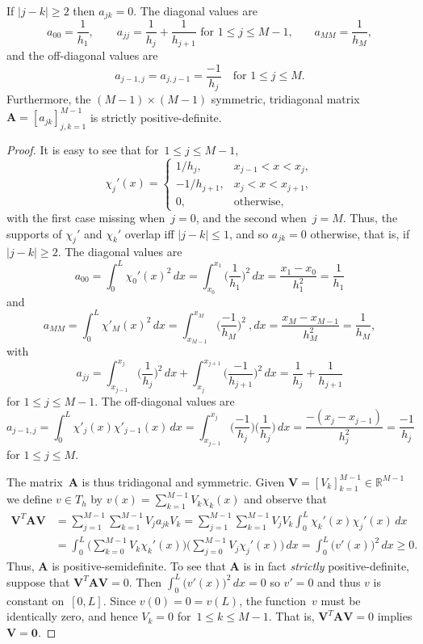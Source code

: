 \begin{theorem}
If $|j-k|\ge2$ then $a_{jk}=0$.  The diagonal values are
\[
a_{00}=\frac{1}{h_1},\qquad
\text{$a_{jj}=\frac{1}{h_j}+\frac{1}{h_{j+1}}$ for $1\le j\le M-1$,}\qquad
a_{MM}=\frac{1}{h_M},
\]
and the off-diagonal values are
\[
a_{j-1,j}=a_{j,j-1}=\frac{-1}{h_j}\quad\text{for $1\le j\le M$.}
\]
Furthermore, the $(M-1)\times(M-1)$ symmetric, tridiagonal 
matrix~$\boldsymbol{A}=[a_{jk}]_{j, k=1}^{M-1}$ is strictly positive-definite.
\end{theorem}
\begin{proof}
It is easy to see that for~$1\le j\le M-1$,
\[
\chi_j'(x)=\begin{cases}
1/h_j,&x_{j-1}<x<x_j,\\
-1/h_{j+1},&x_j<x<x_{j+1},\\
0,&\text{otherwise,}
\end{cases}
\]
with the first case missing when~$j=0$, and the second when~$j=M$.  Thus,
the supports of $\chi_j'$ and $\chi_k'$ overlap iff $|j-k|\le1$, and so 
$a_{jk}=0$ otherwise, that is, if $|j-k|\ge2$.  The diagonal 
values are
\[
a_{00}=\int_0^L\chi_0'(x)^2\,dx
    =\int_{x_0}^{x_1}\biggl(\frac{1}{h_1}\biggr)^2\,dx
    =\frac{x_1-x_0}{h_1^2}=\frac{1}{h_1}
\]
and
\[
a_{MM}=\int_0^L\chi'_M(x)^2\,dx
    =\int_{x_{M-1}}^{x_M}\biggl(\frac{-1}{h_M}\biggr)^2\ , dx
    =\frac{x_M-x_{M-1}}{h_M^2}=\frac{1}{h_M},
\]
with
\[
a_{jj}=\int_{x_{j-1}}^{x_j}\biggl(\frac{1}{h_j}\biggr)^2\,dx
      +\int_{x_j}^{x_{j+1}}\biggl(\frac{-1}{h_{j+1}}\biggr)^2\,dx
        =\frac{1}{h_j}+\frac{1}{h_{j+1}}
\]
for $1\le j\le M-1$.  The off-diagonal values are
\[
a_{j-1,j}=\int_0^L\chi'_j(x)\chi'_{j-1}(x)\,dx
    =\int_{x_{j-1}}^{x_j}\biggl(\frac{-1}{h_j}\biggr)
    \biggl(\frac{1}{h_j}\biggr)\,dx=\frac{-(x_j-x_{j-1})}{h_j^2}=\frac{-1}{h_j}
\]
for $1\le j\le M$. 

The matrix~$\boldsymbol{A}$ is thus tridiagonal and symmetric.  Given
$\boldsymbol{V}=[V_k]_{k=1}^{M-1}\in\mathbb{R}^{M-1}$
we define $v\in T_h$ by $v(x)=\sum_{k=1}^{M-1}V_k\chi_k(x)$ and observe that
\begin{align*}
\boldsymbol{V}^T\boldsymbol{A}\boldsymbol{V}
    &=\sum_{j=1}^{M-1}\sum_{k=1}^{M-1}V_ja_{jk}V_k
    =\sum_{j=1}^{M-1}\sum_{k=1}^{M-1}V_jV_k\int_0^L\chi_k'(x)\chi_j'(x)\,dx\\
    &=\int_0^L\biggl(\sum_{k=0}^{M-1}V_k\chi_k'(x)\biggr)
             \biggl(\sum_{j=0}^{M-1}V_j\chi_j'(x)\biggr)\,dx
    =\int_0^L\bigl(v'(x)\bigr)^2\,dx\ge0.
\end{align*}
Thus, $\boldsymbol{A}$ is positive-semidefinite.  To see that
$\boldsymbol{A}$ is in fact \emph{strictly} positive-definite, suppose that
$\boldsymbol{V}^T\boldsymbol{A}\boldsymbol{V}=0$. Then 
$\int_0^L\bigl(v'(x)\bigr)^2\,dx=0$ so $v'=0$ and thus $v$ is constant 
on~$[0,L]$. Since $v(0)=0=v(L)$, the function~$v$ must be identically zero, 
and hence $V_k=0$ for~$1\le k\le M-1$.   That is, 
$\boldsymbol{V}^T\boldsymbol{A}\boldsymbol{V}=0$ implies 
$\boldsymbol{V}=\boldsymbol{0}$.
\end{proof}


